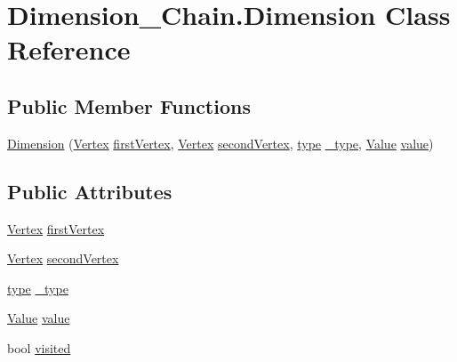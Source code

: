 \hypertarget{class_dimension___chain_1_1_dimension}{}\section{Dimension\+\_\+\+Chain.\+Dimension Class Reference}
\label{class_dimension___chain_1_1_dimension}
\subsection*{Public Member Functions}
\begin{DoxyCompactItemize}
\item 
\mbox{\hyperlink{class_dimension___chain_1_1_dimension_a4d20f1328ddc226bcbdf693ab62782d2}{Dimension}} (\mbox{\hyperlink{class_dimension___chain_1_1_vertex}{Vertex}} \mbox{\hyperlink{class_dimension___chain_1_1_dimension_a2eba65a35b73d444960c5b7640f3a44a}{first\+Vertex}}, \mbox{\hyperlink{class_dimension___chain_1_1_vertex}{Vertex}} \mbox{\hyperlink{class_dimension___chain_1_1_dimension_af58340b2d25b2de18c1fc796ad5aedeb}{second\+Vertex}}, \mbox{\hyperlink{namespace_dimension___chain_a6ec9051138598c61cc00acf2547dced4}{type}} \mbox{\hyperlink{class_dimension___chain_1_1_dimension_ac18f5f8b3700a2ce95008310acf6213f}{\+\_\+type}}, \mbox{\hyperlink{class_dimension___chain_1_1_value}{Value}} \mbox{\hyperlink{class_dimension___chain_1_1_dimension_a742090c0440d5a7474adf61c071f5e47}{value}})
\end{DoxyCompactItemize}
\subsection*{Public Attributes}
\begin{DoxyCompactItemize}
\item 
\mbox{\hyperlink{class_dimension___chain_1_1_vertex}{Vertex}} \mbox{\hyperlink{class_dimension___chain_1_1_dimension_a2eba65a35b73d444960c5b7640f3a44a}{first\+Vertex}}
\item 
\mbox{\hyperlink{class_dimension___chain_1_1_vertex}{Vertex}} \mbox{\hyperlink{class_dimension___chain_1_1_dimension_af58340b2d25b2de18c1fc796ad5aedeb}{second\+Vertex}}
\item 
\mbox{\hyperlink{namespace_dimension___chain_a6ec9051138598c61cc00acf2547dced4}{type}} \mbox{\hyperlink{class_dimension___chain_1_1_dimension_ac18f5f8b3700a2ce95008310acf6213f}{\+\_\+type}}
\item 
\mbox{\hyperlink{class_dimension___chain_1_1_value}{Value}} \mbox{\hyperlink{class_dimension___chain_1_1_dimension_a742090c0440d5a7474adf61c071f5e47}{value}}
\item 
bool \mbox{\hyperlink{class_dimension___chain_1_1_dimension_ab0492cdbb367b933ad455eacfd2e9c71}{visited}}
\end{DoxyCompactItemize}


